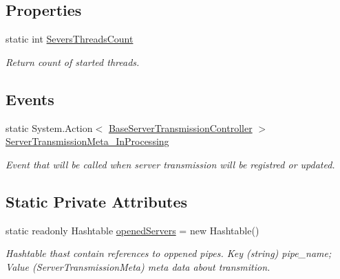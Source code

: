 \subsection*{Properties}
\begin{DoxyCompactItemize}
\item 
static int \mbox{\hyperlink{class_pipes_provider_1_1_server_1_1_server_a_p_i_a897f31aa880601dd930553266d7dd1ee}{Severs\+Threads\+Count}}
\begin{DoxyCompactList}\small\item\em Return count of started threads. \end{DoxyCompactList}\end{DoxyCompactItemize}
\subsection*{Events}
\begin{DoxyCompactItemize}
\item 
static System.\+Action$<$ \mbox{\hyperlink{class_pipes_provider_1_1_server_1_1_transmission_controllers_1_1_base_server_transmission_controller}{Base\+Server\+Transmission\+Controller}} $>$ \mbox{\hyperlink{class_pipes_provider_1_1_server_1_1_server_a_p_i_adf4c77f25cd481b8190240e4aca06e56}{Server\+Transmission\+Meta\+\_\+\+In\+Processing}}
\begin{DoxyCompactList}\small\item\em Event that will be called when server transmission will be registred or updated. \end{DoxyCompactList}\end{DoxyCompactItemize}
\subsection*{Static Private Attributes}
\begin{DoxyCompactItemize}
\item 
static readonly Hashtable \mbox{\hyperlink{class_pipes_provider_1_1_server_1_1_server_a_p_i_ac18f0fca4de6269edeb97379112e67ca}{opened\+Servers}} = new Hashtable()
\begin{DoxyCompactList}\small\item\em Hashtable thast contain references to oppened pipes. Key (string) pipe\+\_\+name; Value (Server\+Transmission\+Meta) meta data about transmition. \end{DoxyCompactList}\end{DoxyCompactItemize}


